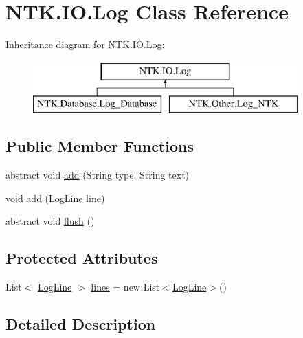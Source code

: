 \hypertarget{class_n_t_k_1_1_i_o_1_1_log}{}\section{N\+T\+K.\+I\+O.\+Log Class Reference}
\label{class_n_t_k_1_1_i_o_1_1_log}


 


Inheritance diagram for N\+T\+K.\+I\+O.\+Log\+:\begin{figure}[H]
\begin{center}
\leavevmode
\includegraphics[height=2.000000cm]{dc/dc2/class_n_t_k_1_1_i_o_1_1_log}
\end{center}
\end{figure}
\subsection*{Public Member Functions}
\begin{DoxyCompactItemize}
\item 
abstract void \mbox{\hyperlink{class_n_t_k_1_1_i_o_1_1_log_a5ffd860f0e7cc3631ae108fc5aca4836}{add}} (String type, String text)
\item 
void \mbox{\hyperlink{class_n_t_k_1_1_i_o_1_1_log_a521fb902fcab4e606227562774d0860c}{add}} (\mbox{\hyperlink{class_n_t_k_1_1_i_o_1_1_log_line}{Log\+Line}} line)
\item 
abstract void \mbox{\hyperlink{class_n_t_k_1_1_i_o_1_1_log_ac59e6a398332c79ad801e79f20ffed10}{flush}} ()
\end{DoxyCompactItemize}
\subsection*{Protected Attributes}
\begin{DoxyCompactItemize}
\item 
List$<$ \mbox{\hyperlink{class_n_t_k_1_1_i_o_1_1_log_line}{Log\+Line}} $>$ \mbox{\hyperlink{class_n_t_k_1_1_i_o_1_1_log_abf91900cf3b8201288ab460793239844}{lines}} = new List$<$\mbox{\hyperlink{class_n_t_k_1_1_i_o_1_1_log_line}{Log\+Line}}$>$()
\end{DoxyCompactItemize}


\subsection{Detailed Description}




